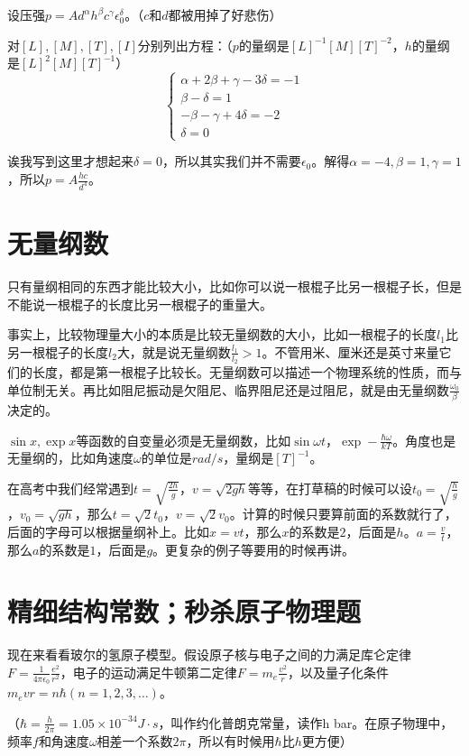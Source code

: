 设压强$p=A d^\alpha h^\beta c^\gamma \epsilon_0^\delta$。（$c$和$d$都被用掉了好悲伤）

对$[L],[M],[T],[I]$分别列出方程：（$p$的量纲是$[L]^{-1} [M] [T]^{-2}$，$h$的量纲是$[L]^2 [M] [T]^{-1}$）
\begin{equation*}
\begin{cases}
\alpha+2\beta+\gamma-3\delta=-1 \\
\beta-\delta=1 \\
-\beta-\gamma+4\delta=-2 \\
\delta=0
\end{cases}
\end{equation*}

诶我写到这里才想起来$\delta=0$，所以其实我们并不需要$\epsilon_0$。解得$\alpha=-4,\beta=1,\gamma=1$，所以$p=A \frac{h c}{d^4}$。
\section{无量纲数}
只有量纲相同的东西才能比较大小，比如你可以说一根棍子比另一根棍子长，但是不能说一根棍子的长度比另一根棍子的重量大。

事实上，比较物理量大小的本质是比较无量纲数的大小，比如一根棍子的长度$l_1$比另一根棍子的长度$l_2$大，就是说无量纲数$\frac{l_1}{l_2}>1$。不管用米、厘米还是英寸来量它们的长度，都是第一根棍子比较长。无量纲数可以描述一个物理系统的性质，而与单位制无关。再比如阻尼振动是欠阻尼、临界阻尼还是过阻尼，就是由无量纲数$\frac{\omega_0}{\beta}$决定的。

$\sin x,\exp x$等函数的自变量必须是无量纲数，比如$\sin \omega t$，$\exp -\frac{\hbar \omega}{k T}$。角度也是无量纲的，比如角速度$\omega$的单位是$\unit{rad/s}$，量纲是$[T]^{-1}$。

在高考中我们经常遇到$t=\sqrt{\frac{2 h}{g}}$，$v=\sqrt{2 g h}$等等，在打草稿的时候可以设$t_0=\sqrt{\frac{h}{g}}$，$v_0=\sqrt{g h}$，那么$t=\sqrt{2} t_0$，$v=\sqrt{2} v_0$。计算的时候只要算前面的系数就行了，后面的字母可以根据量纲补上。比如$x=v t$，那么$x$的系数是$2$，后面是$h$。$a=\frac{v}{t}$，那么$a$的系数是$1$，后面是$g$。更复杂的例子等要用的时候再讲。
\section{精细结构常数；秒杀原子物理题}
现在来看看玻尔的氢原子模型。假设原子核与电子之间的力满足库仑定律$F=\frac{1}{4 \pi \epsilon_0} \frac{e^2}{r^2}$，电子的运动满足牛顿第二定律$F=m_e \frac{v^2}{r}$，以及量子化条件$m_e v r =n \hbar (n=1,2,3,\dots)$。

（$\hbar=\frac{h}{2 \pi}=1.05 \times 10^{-34} \unit{J \cdot s}$，叫作约化普朗克常量，读作h bar。在原子物理中，频率$f$和角速度$\omega$相差一个系数$2 \pi$，所以有时候用$\hbar$比$h$更方便）

